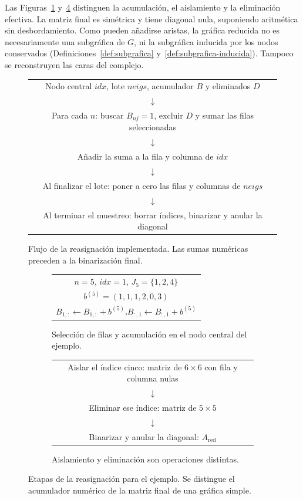 Las Figuras~\ref{fig:flujo-reduccion} y~\ref{fig:algoritmo_eliminacion} distinguen la acumulación, el aislamiento y la eliminación efectiva. La matriz final es simétrica y tiene diagonal nula, suponiendo aritmética sin desbordamiento. Como pueden añadirse aristas, la gráfica reducida no es necesariamente una subgráfica de $G$, ni la subgráfica inducida por los nodos conservados (Definiciones~\ref{def:subgrafica} y~\ref{def:subgrafica-inducida}). Tampoco se reconstruyen las caras del complejo.

\begin{figure}[H]
\centering
\begin{tabular}{c}
Nodo central $idx$, lote $neigs$, acumulador $B$ y eliminados $D$\\
$\downarrow$\\
Para cada $n$: buscar $B_{nj}=1$, excluir $D$ y sumar las filas seleccionadas\\
$\downarrow$\\
Añadir la suma a la fila y columna de $idx$\\
$\downarrow$\\
Al finalizar el lote: poner a cero las filas y columnas de $neigs$\\
$\downarrow$\\
Al terminar el muestreo: borrar índices, binarizar y anular la diagonal
\end{tabular}
\caption{Flujo de la reasignación implementada. Las sumas numéricas preceden a la binarización final.}
\label{fig:flujo-reduccion}
\end{figure}

\begin{figure}[H]
\centering
\begin{subfigure}[t]{0.95\textwidth}
\centering
\begin{tabular}{c}
$n=5$, $idx=1$, $J_5=\{1,2,4\}$\\
$b^{(5)}=(1,1,1,2,0,3)$\\
$B_{1,:}\gets B_{1,:}+b^{(5)}$,\quad $B_{:,1}\gets B_{:,1}+b^{(5)}$
\end{tabular}
\caption{Selección de filas y acumulación en el nodo central del ejemplo.}
\label{fig:algoritmo_parte1}
\end{subfigure}

\vspace{0.4cm}
\begin{subfigure}[t]{0.95\textwidth}
\centering
\begin{tabular}{c}
Aislar el índice cinco: matriz de $6\times6$ con fila y columna nulas\\
$\downarrow$\\
Eliminar ese índice: matriz de $5\times5$\\
$\downarrow$\\
Binarizar y anular la diagonal: $A_{\mathrm{red}}$
\end{tabular}
\caption{Aislamiento y eliminación son operaciones distintas.}
\label{fig:algoritmo_parte2}
\end{subfigure}
\caption{Etapas de la reasignación para el ejemplo. Se distingue el acumulador numérico de la matriz final de una gráfica simple.}
\label{fig:algoritmo_eliminacion}
\end{figure}

